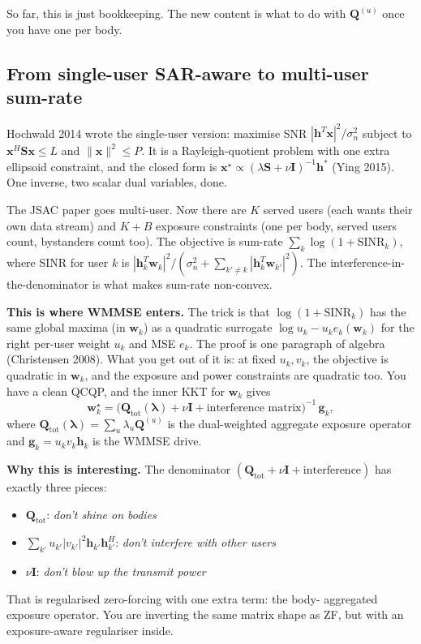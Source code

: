 \documentclass[11pt]{article}
\newcommand{\xx}{\mathbf{x}}
\newcommand{\hh}{\mathbf{h}}
\newcommand{\ww}{\mathbf{w}}
\newcommand{\gvec}{\mathbf{g}}
\newcommand{\Qmat}{\mathbf{Q}}
\begin{document}
So far, this is just bookkeeping. The new content is what to do with
$\Qmat^{(u)}$ once you have one per body.

\subsection{From single-user SAR-aware to multi-user sum-rate}

Hochwald 2014 wrote the single-user version: maximise SNR
$|\hh^T \xx|^2 / \sigma_n^2$ subject to $\xx^H \mathbf{S} \xx \leq L$
and $\|\xx\|^2 \leq P$. It is a Rayleigh-quotient problem with one
extra ellipsoid constraint, and the closed form is
$\xx^\star \propto (\lambda \mathbf{S} + \nu \mathbf{I})^{-1} \hh^*$
(Ying 2015). One inverse, two scalar dual variables, done.

The JSAC paper goes multi-user. Now there are $K$ served users (each
wants their own data stream) and $K + B$ exposure constraints (one per
body, served users count, bystanders count too). The objective is
sum-rate $\sum_k \log(1 + \mathrm{SINR}_k)$, where SINR for user $k$
is $|\hh_k^T \ww_k|^2 / (\sigma_n^2 + \sum_{k' \neq k} |\hh_k^T
\ww_{k'}|^2)$. The interference-in-the-denominator is what makes
sum-rate non-convex.

\textbf{This is where WMMSE enters.} The trick is that
$\log(1 + \mathrm{SINR}_k)$ has the same global maxima (in $\ww_k$)
as a quadratic surrogate
$\log u_k - u_k e_k(\ww_k)$ for the right per-user weight $u_k$ and
MSE $e_k$. The proof is one paragraph of algebra (Christensen 2008).
What you get out of it is: at fixed $u_k, v_k$, the objective is
quadratic in $\ww_k$, and the exposure and power constraints are
quadratic too. You have a clean QCQP, and the inner KKT for $\ww_k$
gives
\begin{equation}\label{eq:closedform-companion}
  \ww_k^\star = \bigl(\Qmat_{\mathrm{tot}}(\bm\lambda) + \nu \mathbf{I}
  + \text{interference matrix}\bigr)^{-1}\,\gvec_k,
\end{equation}
where $\Qmat_{\mathrm{tot}}(\bm\lambda) = \sum_u \lambda_u \Qmat^{(u)}$
is the dual-weighted aggregate exposure operator and $\gvec_k =
u_k v_k \hh_k$ is the WMMSE drive.

\textbf{Why this is interesting.} The denominator
$(\Qmat_{\mathrm{tot}} + \nu \mathbf{I} + \text{interference})$ has
exactly three pieces:
\begin{itemize}[leftmargin=1.4em,itemsep=2pt]
  \item $\Qmat_{\mathrm{tot}}$: \emph{don't shine on bodies}
  \item $\sum_{k'} u_{k'} |v_{k'}|^2 \hh_{k'} \hh_{k'}^H$:
  \emph{don't interfere with other users}
  \item $\nu \mathbf{I}$: \emph{don't blow up the transmit power}
\end{itemize}
That is regularised zero-forcing with one extra term: the body-
aggregated exposure operator. You are inverting the same matrix shape
as ZF, but with an exposure-aware regulariser inside.
\end{document}

